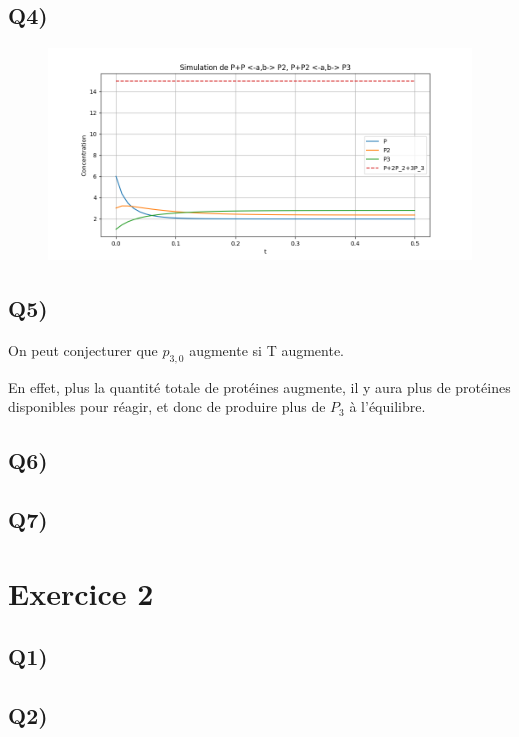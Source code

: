 \documentclass[12pt,a4paper]{article}
\begin{document}
\newpage
\subsection*{Q4)}
\begin{figure}[h!]
	\includegraphics[scale=0.75]{"graph_ex1_q4.png"}
\end{figure}

\subsection*{Q5)}

On peut conjecturer que $p_{3,0}$ augmente si T augmente. 

En effet, plus la quantité totale de protéines augmente, il y aura plus de protéines disponibles pour réagir, et donc de produire plus de $P_3$ à l'équilibre.

\subsection*{Q6)}

\subsection*{Q7)}


\section*{Exercice 2}
\subsection*{Q1)}

\subsection*{Q2)}
\end{document}
